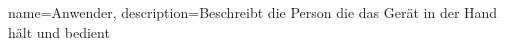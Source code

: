 {
  name=Anwender,
  description={Beschreibt die Person die das Gerät in der Hand hält und bedient}
}
